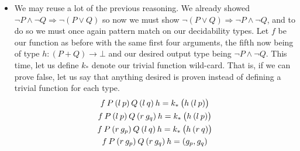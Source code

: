\documentclass[11pt]{article}
\begin{document}
\begin{my proof}
\begin{itemize}
\item We may reuse a lot of the previous reasoning. We already showed $\neg P \wedge \neg Q \Rightarrow \neg (P \vee Q)$ so now we must show $\neg (P \vee Q) \Rightarrow \neg P \wedge \neg Q$, and to do so we must once again pattern match on our decidability types. Let $f$ be our function as before with the same first four arguments, the fifth now being of type $h \colon (P + Q) \to \bot$ and our desired output type being $\neg P \wedge \neg Q$. This time, let us define $k_*$ denote our trivial function wild-card. That is, if we can prove false, let us say that anything desired is proven instead of defining a trivial function for each type. \begin{gather*}
f \hspace{0.2em} P \hspace{0.2em} (l \hspace{0.2em} p) \hspace{0.2em} Q \hspace{0.2em} (l \hspace{0.2em} q) \hspace{0.2em} h = k_* \hspace{0.2em} \big(h \hspace{0.2em} (l \hspace{0.2em} p) \big) \\
f \hspace{0.2em} P \hspace{0.2em} (l \hspace{0.2em} p) \hspace{0.2em} Q \hspace{0.2em} (r \hspace{0.2em} g_q) \hspace{0.2em} h = k_* \hspace{0.2em} \big(h \hspace{0.2em} (l \hspace{0.2em} p) \big) \\
f \hspace{0.2em} P \hspace{0.2em} (r \hspace{0.2em} g_p) \hspace{0.2em} Q \hspace{0.2em} (l \hspace{0.2em} q) \hspace{0.2em} h = k_* \hspace{0.2em} \big(h \hspace{0.2em} (r \hspace{0.2em} q) \big) \\
f \hspace{0.2em} P \hspace{0.2em} (r \hspace{0.2em} g_p) \hspace{0.2em} Q \hspace{0.2em} (r \hspace{0.2em} g_q) \hspace{0.2em} h = (g_p,g_q)
\end{gather*}
\end{itemize}
\end{my proof}
\end{document}
